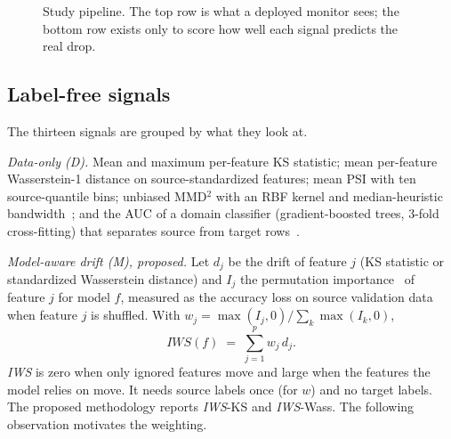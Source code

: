 \documentclass[conference]{IEEEtran}
\theoremstyle{plainhead}
\newcommand{\iws}{\textit{IWS}}
\begin{document}
\begin{figure}[t]
\centering
{}
\caption{Study pipeline. The top row is what a deployed monitor sees; the bottom row exists only to score how well each signal predicts the real drop.}
\label{fig:pipeline}
\end{figure}

\subsection{Label-free signals}
The thirteen signals are grouped by what they look at.

\textit{Data-only (D).} Mean and maximum per-feature KS statistic; mean per-feature Wasserstein-1 distance on source-standardized features; mean PSI with ten source-quantile bins; unbiased MMD$^2$ with an RBF kernel and median-heuristic bandwidth~\cite{biggs2023mmdfuse}; and the AUC of a domain classifier (gradient-boosted trees, 3-fold cross-fitting) that separates source from target rows~\cite{pandeva2024e,nguyen2025reliably}.

\textit{Model-aware drift (M), proposed.} Let $d_j$ be the drift of feature $j$ (KS statistic or standardized Wasserstein distance) and $I_j$ the permutation importance~\cite{chamma2024variable} of feature $j$ for model $f$, measured as the accuracy loss on source validation data when feature $j$ is shuffled. With $w_j=\max(I_j,0)/\sum_k \max(I_k,0)$,
\begin{equation}
\iws(f) \;=\; \sum_{j=1}^{p} w_j\, d_j .
\label{eq:iws}
\end{equation}
\iws{} is zero when only ignored features move and large when the features the model relies on move. It needs source labels once (for $w$) and no target labels. The proposed methodology reports \iws{}-KS and \iws{}-Wass. The following observation motivates the weighting.
\end{document}
